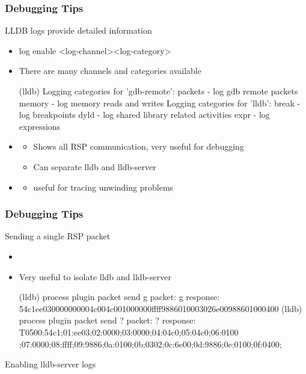 \begin{frame}[fragile]
\frametitle{Debugging Tips}
LLDB logs provide detailed information
\begin{itemize}
    \item log enable \textless log-channel\textgreater  \textless log-category\textgreater
    \item There are many channels and categories available
    \begin{codebox2}
(lldb) 
Logging categories for 'gdb-remote':
  packets - log gdb remote packets
  memory - log memory reads and writes
Logging categories for 'lldb':
  break - log breakpoints  
  dyld - log shared library related activities
  expr - log expressions    
    \end{codebox2}
    \item {}
    \begin{itemize}
        \item Shows all RSP communication, very useful for debugging
        \item Can separate lldb and lldb-server
    \end{itemize}
    \item {}
    \begin{itemize}
        \item useful for tracing unwinding problems
    \end{itemize}
\end{itemize}
\end{frame}

\begin{frame}[fragile]
\frametitle{Debugging Tips}
Sending a single RSP packet
\begin{itemize}
    \item {}
    \item Very useful to isolate lldb and lldb-server
    \begin{codebox}
(lldb) process plugin packet send g
packet: g
response: 54c1ee030000000004c004c001000000ffff9886010003026e00988601000400
(lldb) process plugin packet send ?
packet: ?
response: T0500:54c1;01:ee03;02:0000;03:0000;04:04c0;05:04c0;06:0100
;07:0000;08:ffff;09:9886;0a:0100;0b:0302;0c:6e00;0d:9886;0e:0100;0f:0400;
    \end{codebox}
\end{itemize}
Enabling lldb-server logs
\begin{itemize}
\end{itemize}
\end{frame}

